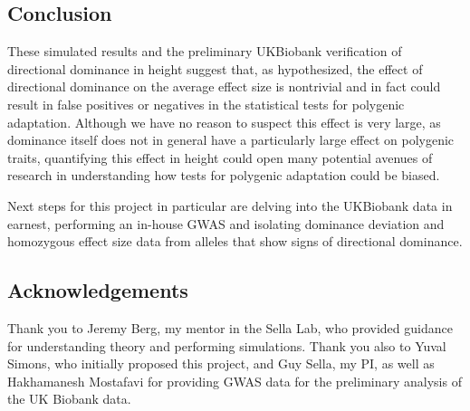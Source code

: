 \documentclass[a4paper,12pt]{article}
\begin{document}
\subsection*{Conclusion}
These simulated results and the preliminary UKBiobank verification of
directional dominance in height suggest that, as hypothesized, the
effect of directional dominance on the average effect size is
nontrivial and in fact could result in false positives or negatives in
the statistical tests for polygenic adaptation. Although we have no
reason to suspect this effect is very large, as dominance
itself does not in general have a particularly large effect on polygenic traits, quantifying this effect in height could open many potential
avenues of research in understanding how tests for polygenic
adaptation could be biased.

Next steps for this project in particular are delving into the
UKBiobank data in earnest, performing an in-house GWAS and
isolating dominance deviation and homozygous effect size data from
alleles that show signs of directional dominance.

\subsection*{Acknowledgements}
Thank you to Jeremy Berg, my mentor in the Sella Lab, who provided
guidance for understanding theory and performing simulations. Thank
you also to Yuval Simons, who initially proposed this project, and Guy Sella, my
PI, as well as Hakhamanesh Mostafavi for providing GWAS data
for the preliminary analysis of the UK Biobank data. 


\pagebreak


\end{document}
